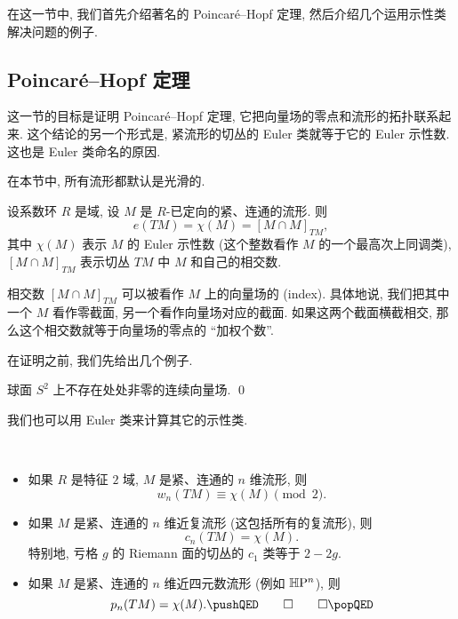 在这一节中, 我们首先介绍著名的 Poincaré--Hopf 定理,
然后介绍几个运用示性类解决问题的例子.

\subsection{Poincaré--Hopf 定理}

这一节的目标是证明 Poincaré--Hopf 定理,
它把向量场的零点和流形的拓扑联系起来.
这个结论的另一个形式是,
紧流形的切丛的 Euler 类就等于它的 Euler 示性数.
这也是 Euler 类命名的原因.

在本节中, 所有流形都默认是光滑的.

\begin{theorem} \label{thm-4-poincare-hopf}
    设系数环 $R$ 是域, 设 $M$ 是 $R$-已定向的紧、连通的流形. 则
    \[ e (TM) = \chi (M) = [M \cap M]_{TM}, \]
    其中 $\chi (M)$ 表示 $M$ 的 Euler 示性数
    (这个整数看作 $M$ 的一个最高次上同调类),
    $[M \cap M]_{TM}$ 表示切丛 $TM$ 中 $M$ 和自己的相交数.
\end{theorem}

\begin{remark}
    相交数 $[M \cap M]_{TM}$ 可以被看作 $M$ 上的向量场的 (index).
    具体地说, 我们把其中一个 $M$ 看作零截面, 另一个看作向量场对应的截面.
    如果这两个截面横截相交, 那么这个相交数就等于向量场的零点的 ``加权个数''.
    \varqed
\end{remark}

在证明之前, 我们先给出几个例子.

\begin{corollary}[毛球定理]
    球面 $S^2$ 上不存在处处非零的连续向量场. \qed
\end{corollary}

我们也可以用 Euler 类来计算其它的示性类.

\begin{corollary}
    \ 
    \begin{itemize}
        \item
            如果 $R$ 是特征 $2$ 域, $M$ 是紧、连通的 $n$ 维流形, 则
            \[ w_n (TM) \equiv \chi (M) \pmod{2}. \]
        \item
            如果 $M$ 是紧、连通的 $n$ 维近复流形 (这包括所有的复流形), 则
            \[ c_n (TM) = \chi (M). \]
            特别地, 亏格 $g$ 的 Riemann 面的切丛的 $c_1$ 类等于 $2 - 2g$.
        \item
            如果 $M$ 是紧、连通的 $n$ 维近四元数流形 (例如 $\mathbb{H} \mathrm{P}^n$), 则
            \[ p_n (TM) = \chi (M). \thmqedhere \]
    \end{itemize}
\end{corollary}


